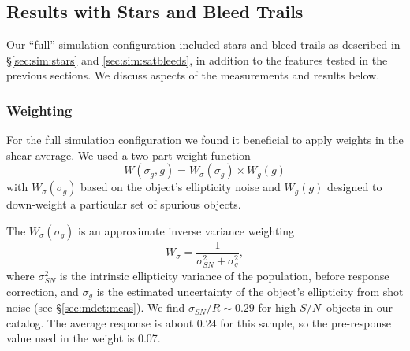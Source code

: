 \documentclass[twocolumn,twocolappendix,astrosym]{openjournal}
\newcommand{\snr}{$S/N$}
\begin{document}
\subsection{Results with Stars and Bleed Trails} \label{sec:results:full}

Our ``full'' simulation configuration included stars and bleed trails as
described in \S \ref{sec:sim:stars} and \ref{sec:sim:satbleeds}, in addition to
the features tested in the previous sections.  We discuss aspects of the
measurements and results below.

\subsubsection{Weighting}

For the full simulation configuration we found it beneficial to apply weights
in the shear average.  We used a two part weight function
\begin{equation}
    W(\sigma_g, g) = W_\sigma (\sigma_g) \times W_g(g)
\end{equation}
with $W_\sigma(\sigma_g)$ based on the object's ellipticity noise and $W_g(g)$
designed to down-weight a particular set of spurious objects.

The $W_\sigma(\sigma_g)$ is an approximate inverse variance weighting
\begin{equation} \label{eq:wsigma}
    W_\sigma = \frac{1}{\sigma_{SN}^2 + \sigma_g^2},
\end{equation}
where $\sigma^2_{SN}$ is the intrinsic ellipticity variance of the population,
before response correction, and $\sigma_g$ is the estimated uncertainty of the
object's ellipticity from shot noise (see \S \ref{sec:mdet:meas}).  We find
$\sigma_{SN}/R \sim 0.29$ for high \snr\ objects in our catalog.  The average
response is about 0.24 for this sample, so the pre-response value used
in the weight is 0.07.
\end{document}
